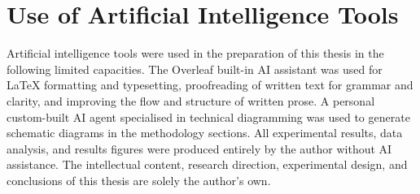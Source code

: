 \chapter*{Use of Artificial Intelligence Tools}
\label{chap:ai-disclosure}

Artificial intelligence tools were used in the preparation of this thesis in the following limited capacities. The Overleaf built-in AI assistant was used for \LaTeX{} formatting and typesetting, proofreading of written text for grammar and clarity, and improving the flow and structure of written prose. A personal custom-built AI agent specialised in technical diagramming was used to generate schematic diagrams in the methodology sections. All experimental results, data analysis, and results figures were produced entirely by the author without AI assistance. The intellectual content, research direction, experimental design, and conclusions of this thesis are solely the author's own.
